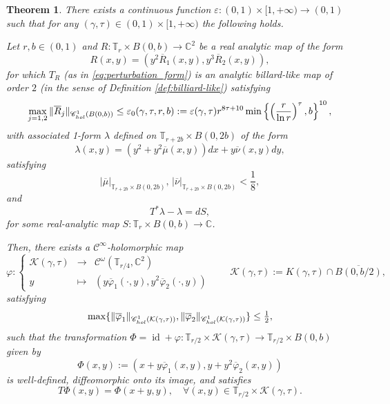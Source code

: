\documentclass[10pt,a4paper]{amsart}
\newtheorem{theorem}{Theorem}
\newcommand{\C}{\mathbb{C}}
\newcommand{\T}{\mathbb{T}}
\DeclareMathOperator{\id}{id}
\begin{document}
\begin{theorem}
\label{thm:KAM}
There exists a continuous function $\varepsilon: (0,1) \times [1, +\infty) \to (0, 1)$ such that for any $(\gamma,\tau)\in(0,1)\times[1,+\infty)$ the following holds.

Let $r,b\in(0,1)$ and $R: \T_r \times B(0, b) \to \C^2$ be a real analytic map of the form
 \begin{equation}
 \label{eq:form_R}
 R(x, y) = (y^2 \overline R_1(x, y), y^3 \overline R_2(x, y)),
 \end{equation}
 for which $T_R$ (as in \eqref{eq:perturbation_form}) is an analytic billard-like map of order $2$ (in the sense of Definition \ref{def:billiard-like}) satisfying 
 \begin{equation}
 \label{eq:smallness_condition_R}
 \max_{j=1,2}
 \| \overline R_j \|_{\mathscr C^1_{\textup{hol}}(B(0,b))}
 \leq \varepsilon_0(\gamma,\tau,r,b) :=\varepsilon(\gamma,\tau)r^{8\tau+10}
 \min\left\{\left(\frac{r}{\ln r}\right)^{\tau},b\right\}^{10},
 \end{equation}
  with associated 1-form $\lambda$ defined on $\T_{r + 2b} \times B(0, 2b)$ of the form
\begin{equation}
\label{eq:form_form}
\lambda(x, y) = (y^2 + y^2\overline \mu(x, y))dx + y \overline \nu(x, y)dy, 
\end{equation}
satisfying
\begin{equation}
    \label{eq:smallness_condition_form}
    | \overline \mu|_{\T_{r + 2b} \times B(0, 2b)},\, | \overline \nu|_{\T_{r + 2b} \times B(0, 2b)} < \frac{1}{8},
\end{equation}
and 
\begin{equation}
    \label{eq:exact_symplectic}
    T^*\lambda - \lambda = dS,
\end{equation}
for some real-analytic map $S: \T_r \times B(0, b) \to \C$.

Then, there exists a $\mathscr{C}^{\infty}$-holomorphic map
\[
{\varphi}:
\left\{
\begin{array}{ccc}
\mathcal K(\gamma, \tau)
& \to &
\mathscr C^\omega(\T_{r/4}, \C^2)\\
y & \mapsto & (y\overline \varphi_1(\cdot,y),y^2\overline \varphi_2(\cdot,y))
\end{array}\right.
\qquad 
\mathcal K(\gamma, \tau):= K(\gamma, \tau)\cap \overline{B(0,b/2)},
\]
satisfying 
    \begin{equation*}
 \label{eq:bounds_curve_constants}
\max\{
\| \overline \varphi_1\|_{\mathscr C^1_{\textup{hol}}(\mathcal K(\gamma, \tau))},
\|\overline \varphi_2\|_{\mathscr C^1_{\textup{hol}}(\mathcal K(\gamma, \tau))}\}
\leq \tfrac{1}{2},
 \end{equation*}
such that the transformation $\Phi=\id +{\varphi}: \T_{r/2} \times \mathcal K(\gamma, \tau) \to \T_{r/2} \times B(0, b)$ given by
 \[
  \Phi(x,y) := (x+y\overline \varphi_1(x,y),y+y^2\overline \varphi_2(x,y))
 \]
is well-defined, diffeomorphic onto its image, and satisfies
\[
T\Phi(x,y) = \Phi(x+y,y),
\quad \forall (x,y)\in\T_{r/2}\times \mathcal K(\gamma, \tau).
\]
\end{theorem}
\end{document}
